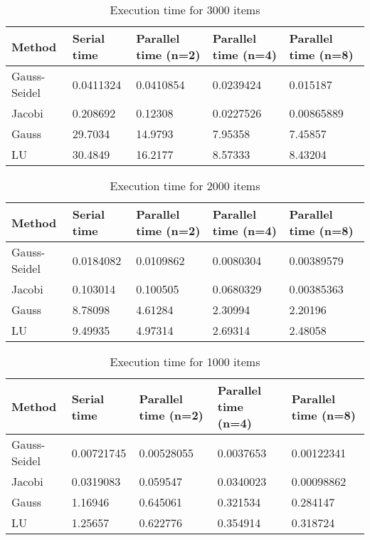 \documentclass[letterpaper,12pt]{article}
\begin{document}
\begin{table}[!htb]
    \centering
      \begin{tabular}{|l|l|l|l|l|}
        \hline
        Method &  Serial time & Parallel time (n=2) & Parallel time (n=4) & Parallel time (n=8)\\
        \hline
        Gauss-Seidel & 0.0411324 & 0.0410854 &  0.0239424 & 0.015187\\
        Jacobi &  0.208692 & 0.12308 & 0.0227526 & 0.00865889\\
        Gauss  & 29.7034 & 14.9793 & 7.95358 & 7.45857 \\
        LU  &  30.4849 & 16.2177 & 8.57333 & 8.43204 \\
        \hline
      \end{tabular}
    \caption{Execution time for 3000 items}\label{tuntime-table}
\end{table}

\newpage

\begin{table}[!htb]
    \centering
      \begin{tabular}{|l|l|l|l|l|}
        \hline
        Method &  Serial time & Parallel time (n=2) & Parallel time (n=4) & Parallel time (n=8)\\
        \hline
        Gauss-Seidel & 0.0184082 & 0.0109862 & 0.0080304 & 0.00389579\\
        Jacobi &  0.103014 & 0.100505 & 0.0680329 & 0.00385363\\
        Gauss  & 8.78098 & 4.61284 & 2.30994 & 2.20196 \\
        LU  &  9.49935 & 4.97314 & 2.69314 & 2.48058 \\
        \hline
      \end{tabular}
    \caption{Execution time for 2000 items}\label{tuntime-table}
\end{table}

\begin{table}[!htb]
    \centering
      \begin{tabular}{|l|l|l|l|l|}
        \hline
        Method &  Serial time & Parallel time (n=2) & Parallel time (n=4) & Parallel time (n=8)\\
        \hline
        Gauss-Seidel & 0.00721745 & 0.00528055 & 0.0037653 & 0.00122341\\
        Jacobi &  0.0319083 & 0.059547 & 0.0340023 & 0.00098862\\
        Gauss  & 1.16946 & 0.645061 & 0.321534 & 0.284147 \\
        LU  &  1.25657 & 0.622776 & 0.354914 & 0.318724 \\
        \hline
      \end{tabular}
    \caption{Execution time for 1000 items}\label{tuntime-table}
\end{table}
\end{document}
